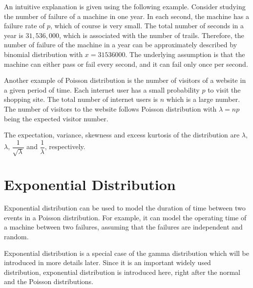 An intuitive explanation is given using the following example. Consider studying the number of failure of a machine in one year. In each second, the machine has a failure rate of $p$, which of course is very small. The total number of seconds in a year is $31,536,000$, which is associated with the number of trails. Therefore, the number of failure of the machine in a year can be approximately described by binomial distribution with $x=31536000$. The underlying assumption is that the machine can either pass or fail every second, and it can fail only once per second.

Another example of Poisson distribution is the number of visitors of a website in a given period of time. Each internet user has a small probability $p$ to visit the shopping site. The total number of internet users is $n$ which is a large number. The number of visitors to the website follows Poisson distribution with $\lambda=np$ being the expected visitor number.

The expectation, variance, skewness and excess kurtosis of the distribution are $\lambda$, $\lambda$, $\dfrac{1}{\sqrt{\lambda}}$ and $\dfrac{1}{\lambda}$, respectively.

\section{Exponential Distribution} \label{sec:exponential_distribution}

Exponential distribution can be used to model the duration of time between two events in a Poisson distribution. For example, it can model the operating time of a machine between two failures, assuming that the failures are independent and random.

Exponential distribution is a special case of the gamma distribution which will be introduced in more details later. Since it is an important widely used distribution, exponential distribution is introduced here, right after the normal and the Poisson distributions.

